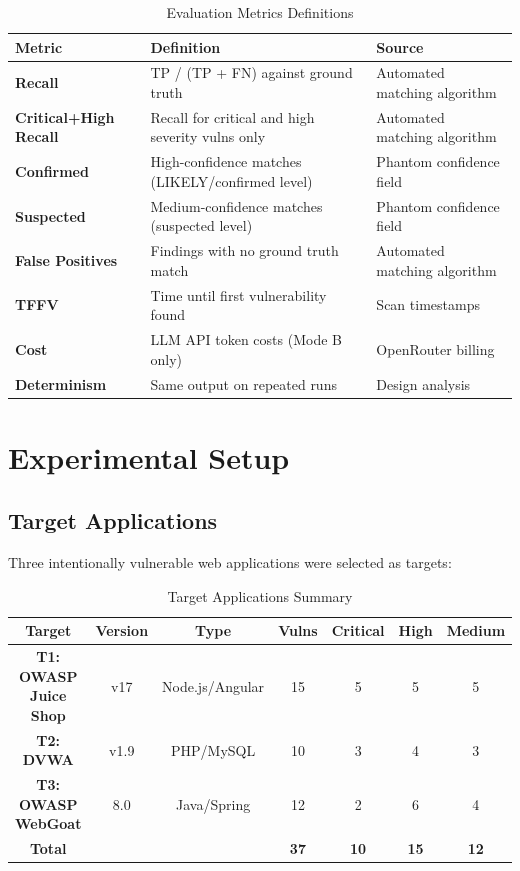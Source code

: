 \documentclass[12pt,a4paper,oneside]{book}
\begin{document}
\begin{table}[h]
\centering
\caption{Evaluation Metrics Definitions}
\label{tab:metrics}
\begin{tabular}{|p{3cm}|p{5cm}|p{3cm}|}
\hline
\textbf{Metric} & \textbf{Definition} & \textbf{Source} \\ \hline
\textbf{Recall} & TP / (TP + FN) against ground truth & Automated matching algorithm \\ \hline
\textbf{Critical+High Recall} & Recall for critical and high severity vulns only & Automated matching algorithm \\ \hline
\textbf{Confirmed} & High-confidence matches (LIKELY/confirmed level) & Phantom confidence field \\ \hline
\textbf{Suspected} & Medium-confidence matches (suspected level) & Phantom confidence field \\ \hline
\textbf{False Positives} & Findings with no ground truth match & Automated matching algorithm \\ \hline
\textbf{TFFV} & Time until first vulnerability found & Scan timestamps \\ \hline
\textbf{Cost} & LLM API token costs (Mode B only) & OpenRouter billing \\ \hline
\textbf{Determinism} & Same output on repeated runs & Design analysis \\ \hline
\end{tabular}
\end{table}

\chapter{Experimental Setup}

\section{Target Applications}

Three intentionally vulnerable web applications were selected as targets:

\begin{table}[h]
\centering
\caption{Target Applications Summary}
\label{tab:targets}
\begin{tabular}{|c|c|c|c|c|c|c|}
\hline
\textbf{Target} & \textbf{Version} & \textbf{Type} & \textbf{Vulns} & \textbf{Critical} & \textbf{High} & \textbf{Medium} \\ \hline
\textbf{T1: OWASP Juice Shop} & v17 & Node.js/Angular & 15 & 5 & 5 & 5 \\ \hline
\textbf{T2: DVWA} & v1.9 & PHP/MySQL & 10 & 3 & 4 & 3 \\ \hline
\textbf{T3: OWASP WebGoat} & 8.0 & Java/Spring & 12 & 2 & 6 & 4 \\ \hline
\textbf{Total} & & & \textbf{37} & \textbf{10} & \textbf{15} & \textbf{12} \\ \hline
\end{tabular}
\end{table}
\end{document}
